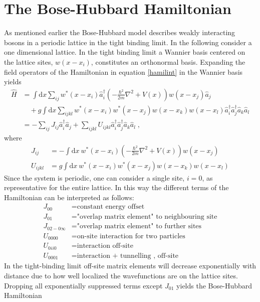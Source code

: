 \section{The Bose-Hubbard Hamiltonian}
As mentioned earlier the Bose-Hubbard model describes weakly interacting bosons in a periodic lattice in the tight binding limit. In the following consider a one dimensional lattice. In the tight binding limit a Wannier basis centered on the lattice sites, $w(x-x_i)$, constitutes an orthonormal basis. Expanding the field operators of the Hamiltonian in equation \ref{hamilint} in  the Wannier basis yields \cite{Jaksch}
\begin{align}
	\hat{H} &= \int \mathrm{d}x \sum_{i j} w^*(x-x_i) \hat{a}_{i}^{\dag} \left( - \frac{\hbar^2}{2 m} \nabla ^2 + V(x) \right) w(x-x_j) \hat{a}_j \nonumber \\
	& \quad + g \int \mathrm{d}x \sum_{i j k l} w^*(x-x_i) w^*(x-x_j) w(x-x_k) w(x-x_l) \hat{a}_{i}^{\dag} \hat{a}_{j}^{\dag} \hat{a}_{k} \hat{a}_{l} \\
	&= - \sum_{i j } J_{i j} \hat{a}_{i}^{\dag} \hat{a}_{j} + \sum_{i j k l} U_{i j k l} \hat{a}_{i}^{\dag} \hat{a}_{j}^{\dag} \hat{a}_{k} \hat{a}_{l} \; ,
\end{align}
where
\begin{align}
	J_{i j} &= - \int \mathrm{d}x \ w^*(x-x_i) \left( - \frac{\hbar^2}{2 m} \nabla ^2 + V(x) \right) w(x-x_j) \\
	U_{i j k l} &= g \int \mathrm{d}x \ w^*(x-x_i) w^*(x-x_j) w(x-x_k) w(x-x_l) 
\end{align}
Since the system is periodic, one can consider a single site, $i = 0$, as representative for the entire lattice. In this way the different terms of the Hamiltonian can be interpreted as follows:
\begin{align}
	J_{0 0} &= \text{constant energy offset} \nonumber \\
	J_{0 1} &= \text{"overlap matrix element" to neighbouring site} \nonumber \\
	J_{0 2 - 0 \infty} &= \text{"overlap matrix element" to further sites} \nonumber \\
	U_{0 0 0 0} &= \text{on-site interaction for two particles} \nonumber \\
	U_{0 i i 0} &= \text{interaction off-site} \nonumber \\
	U_{0 0 0 1} &= \text{interaction  + tunnelling , off-site} \nonumber 
\end{align}
In the tight-binding limit off-site matrix elements will decrease exponentially with distance due to how well localized the wavefunctions are on the lattice sites. Dropping all exponentially suppressed terms except $J_{0 1}$ yields the Bose-Hubbard Hamiltonian
